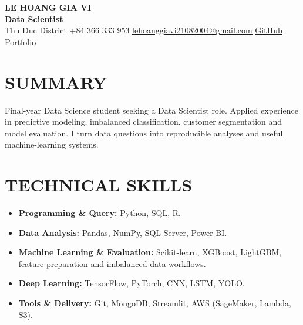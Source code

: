 \documentclass[10pt,letterpaper]{article}
\newcommand{\cvsection}[2]{\section*{\faIcon{#1}\hspace{0.45em}#2}}
\newcommand{\cvlink}[2]{\href{#1}{\underline{#2}}}
\newcommand{\cvitem}[1]{\item \small #1}
\begin{document}
\begin{center}
  {\fontsize{20}{22}\selectfont\bfseries LE HOANG GIA VI}\\[0.22em]
  {\fontsize{17}{19}\selectfont\bfseries Data Scientist}\\[0.42em]
  {\small
  \hspace{0.2em}Thu Duc District
  \quad
  \hspace{0.2em}+84 366 333 953
  \quad
  \hspace{0.2em}\cvlink{mailto:lehoanggiavi21082004@gmail.com}{lehoanggiavi21082004@gmail.com}
  \quad
  \hspace{0.2em}\cvlink{https://github.com/lehoanggiavi}{GitHub}
  \quad
  \hspace{0.2em}\cvlink{https://lehoanggiavi.github.io/portfolio/?role=ds}{Portfolio}}
\end{center}

\cvsection{user}{SUMMARY}
\normalsize
Final-year Data Science student seeking a Data Scientist role. Applied experience in predictive
modeling, imbalanced classification, customer segmentation and model evaluation. I turn data
questions into reproducible analyses and useful machine-learning systems.

\cvsection{tools}{TECHNICAL SKILLS}
\begin{itemize}[leftmargin=1.55em,itemsep=0em,topsep=0em,parsep=0em]
  \cvitem{\textbf{Programming \& Query:} Python, SQL, R.}
  \cvitem{\textbf{Data Analysis:} Pandas, NumPy, SQL Server, Power BI.}
  \cvitem{\textbf{Machine Learning \& Evaluation:} Scikit-learn, XGBoost, LightGBM, feature preparation and imbalanced-data workflows.}
  \cvitem{\textbf{Deep Learning:} TensorFlow, PyTorch, CNN, LSTM, YOLO.}
  \cvitem{\textbf{Tools \& Delivery:} Git, MongoDB, Streamlit, AWS (SageMaker, Lambda, S3).}
\end{itemize}
\end{document}
